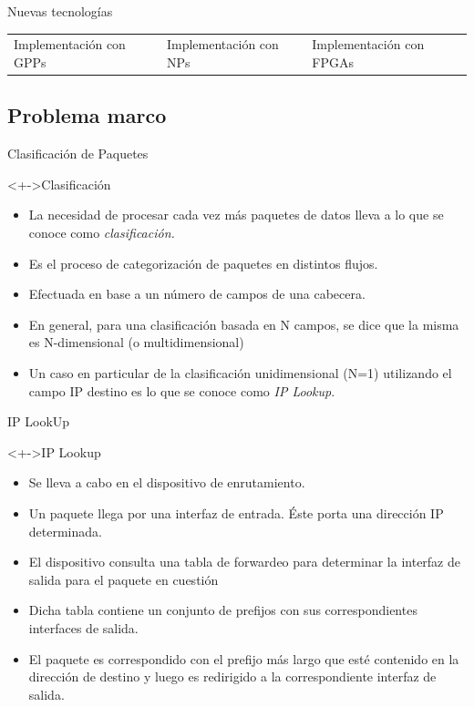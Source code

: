 \documentclass[xcolor=dvipsnames]{beamer}
\begin{document}
\begin{frame}{Nuevas tecnologías}
\begin{tabularx}{\linewidth}{VVV}
      \\
      \tiny Implementación con GPPs
      &
      \tiny Implementación con NPs
      &
      \tiny Implementación con FPGAs
      \\
    \end{tabularx}
\end{frame}

\subsection{Problema marco}
\begin{frame}{Clasificación de Paquetes}

 \begin{block}<+->{Clasificación}   
    \begin{itemize}
      \scriptsize
      \item La necesidad de procesar cada vez más paquetes de datos lleva a lo que se conoce como \textit{clasificación.}
      \item Es el proceso de categorización de paquetes en distintos flujos.
      \item Efectuada en base a un número de campos de una cabecera.
      \item En general, para una clasificación basada en N campos, se dice que la misma es N-dimensional (o multidimensional) 
      \item Un caso en particular de la clasificación unidimensional (N=1) utilizando el campo IP destino es lo que se conoce como \textit{IP Lookup}.     
    \end{itemize}
  \end{block}

\end{frame}

\begin{frame}{IP LookUp}

 \begin{block}<+->{IP Lookup}   
    \begin{itemize}
      \scriptsize
      \item Se lleva a cabo en el dispositivo de enrutamiento.
      \item Un paquete llega por una interfaz de entrada. Éste porta una dirección IP determinada.
      \item El dispositivo consulta una tabla de forwardeo para determinar la interfaz de salida para el paquete en cuestión
      \item Dicha tabla contiene un conjunto de prefijos con sus correspondientes interfaces de salida.
      \item El paquete es correspondido con el prefijo más largo que esté contenido en la dirección de destino y luego es redirigido  a la correspondiente interfaz de salida.
   
    \end{itemize}
  \end{block}

\end{frame}
\end{document}

